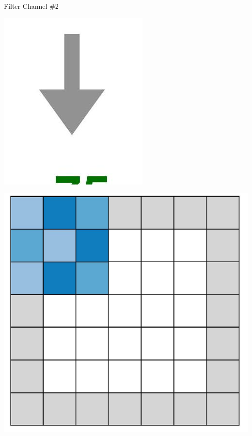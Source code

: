 \documentclass[10pt]{article}
\begin{document}
Filter Channel \#2

\begin{center}
\includegraphics[max width=\textwidth]{2024_01_08_959e2db67a31f073f6d2g-07(4)}
\end{center}

\begin{center}
\includegraphics[max width=\textwidth]{2024_01_08_959e2db67a31f073f6d2g-07(6)}
\end{center}
\end{document}
